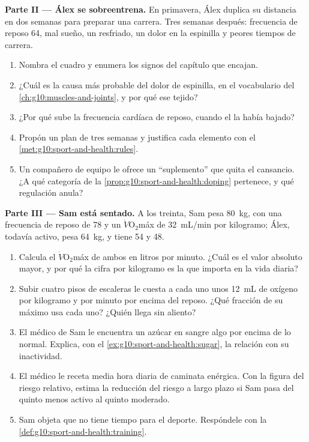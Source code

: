 \begin{problem}
\medskip
\noindent\textbf{Parte II --- Álex se sobreentrena.}
En primavera, Álex duplica su distancia en dos semanas para preparar
una carrera. Tres semanas después: frecuencia de reposo 64, mal sueño,
un resfriado, un dolor en la espinilla y peores tiempos de carrera.
\begin{enumerate}[resume]
  \item Nombra el cuadro y enumera los signos del capítulo que
        encajan.
  \item ¿Cuál es la causa más probable del dolor de espinilla, en el
        vocabulario del \cref{ch:g10:muscles-and-joints}, y por qué ese
        tejido?
  \item ¿Por qué sube la frecuencia cardíaca de reposo, cuando el
         la había bajado?
  \item Propón un plan de tres semanas y justifica cada elemento con el
        \cref{met:g10:sport-and-health:rules}.
  \item Un compañero de equipo le ofrece un ``suplemento'' que quita el
        cansancio. ¿A qué categoría de la
        \cref{prop:g10:sport-and-health:doping} pertenece, y qué
        regulación anula?
\end{enumerate}

\medskip
\noindent\textbf{Parte III --- Sam está sentado.}
A los treinta, Sam pesa \qty{80}{kg}, con una frecuencia de reposo de
78 y un $\dot V\!\mathrm{O_2}$máx de \qty{32}{mL/min} por kilogramo;
Álex, todavía activo, pesa \qty{64}{kg}, y tiene 54 y \num{48}.
\begin{enumerate}[resume]
  \item Calcula el $\dot V\!\mathrm{O_2}$máx de ambos en litros por
        minuto. ¿Cuál es el valor absoluto mayor, y por qué la cifra
        por kilogramo es la que importa en la vida diaria?
  \item Subir cuatro pisos de escaleras le cuesta a cada uno unos
        \qty{12}{mL} de oxígeno por kilogramo y por minuto por encima
        del reposo. ¿Qué fracción de su máximo usa cada uno? ¿Quién
        llega sin aliento?
  \item El médico de Sam le encuentra un azúcar en sangre algo por
        encima de lo normal. Explica, con el
        \cref{ex:g10:sport-and-health:sugar}, la relación con su
        inactividad.
  \item El médico le receta media hora diaria de caminata enérgica. Con
        la figura del riesgo relativo, estima la reducción del riesgo a
        largo plazo si Sam pasa del quinto menos activo al quinto
        moderado.
  \item Sam objeta que no tiene tiempo para el deporte. Respóndele con
        la \cref{def:g10:sport-and-health:training}.
\end{enumerate}


\end{problem}

